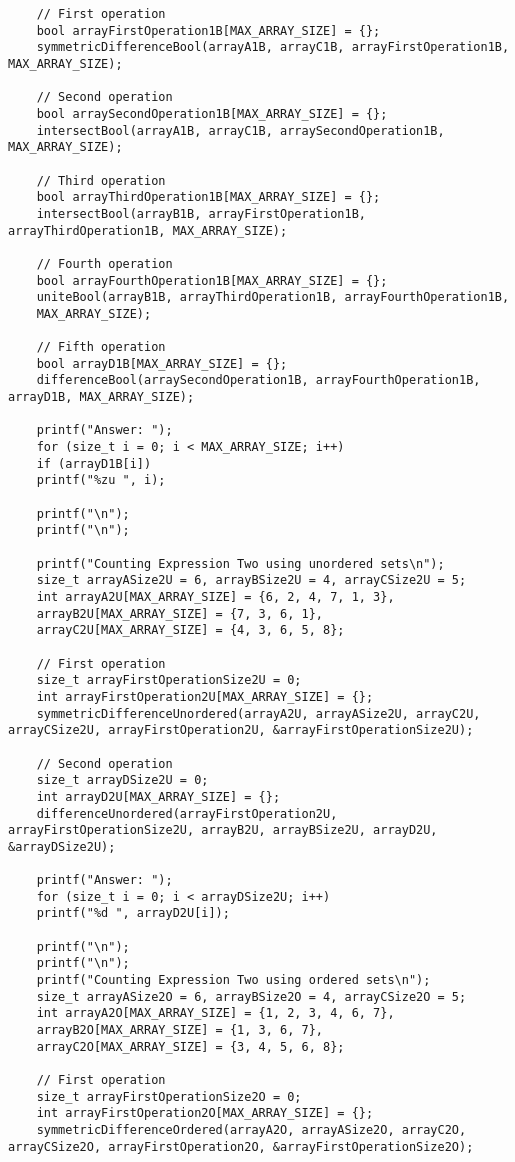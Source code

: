\documentclass[a4paper,14pt]{extarticle}
\begin{document}
\begin{enumerate}[№1. ]
\begin{verbatim}
	// First operation
	bool arrayFirstOperation1B[MAX_ARRAY_SIZE] = {};
	symmetricDifferenceBool(arrayA1B, arrayC1B, arrayFirstOperation1B, MAX_ARRAY_SIZE);
	
	// Second operation
	bool arraySecondOperation1B[MAX_ARRAY_SIZE] = {};
	intersectBool(arrayA1B, arrayC1B, arraySecondOperation1B, MAX_ARRAY_SIZE);
	
	// Third operation
	bool arrayThirdOperation1B[MAX_ARRAY_SIZE] = {};
	intersectBool(arrayB1B, arrayFirstOperation1B, arrayThirdOperation1B, MAX_ARRAY_SIZE);
	
	// Fourth operation
	bool arrayFourthOperation1B[MAX_ARRAY_SIZE] = {};
	uniteBool(arrayB1B, arrayThirdOperation1B, arrayFourthOperation1B,
	MAX_ARRAY_SIZE);
	
	// Fifth operation
	bool arrayD1B[MAX_ARRAY_SIZE] = {};
	differenceBool(arraySecondOperation1B, arrayFourthOperation1B, arrayD1B, MAX_ARRAY_SIZE);
	
	printf("Answer: ");
	for (size_t i = 0; i < MAX_ARRAY_SIZE; i++)
	if (arrayD1B[i])
	printf("%zu ", i);
	
	printf("\n");
	printf("\n");
	
	printf("Counting Expression Two using unordered sets\n");
	size_t arrayASize2U = 6, arrayBSize2U = 4, arrayCSize2U = 5;
	int arrayA2U[MAX_ARRAY_SIZE] = {6, 2, 4, 7, 1, 3},
	arrayB2U[MAX_ARRAY_SIZE] = {7, 3, 6, 1},
	arrayC2U[MAX_ARRAY_SIZE] = {4, 3, 6, 5, 8};
	
	// First operation
	size_t arrayFirstOperationSize2U = 0;
	int arrayFirstOperation2U[MAX_ARRAY_SIZE] = {};
	symmetricDifferenceUnordered(arrayA2U, arrayASize2U, arrayC2U, arrayCSize2U, arrayFirstOperation2U, &arrayFirstOperationSize2U);
	
	// Second operation
	size_t arrayDSize2U = 0;
	int arrayD2U[MAX_ARRAY_SIZE] = {};
	differenceUnordered(arrayFirstOperation2U, arrayFirstOperationSize2U, arrayB2U, arrayBSize2U, arrayD2U, &arrayDSize2U);
	
	printf("Answer: ");
	for (size_t i = 0; i < arrayDSize2U; i++)
	printf("%d ", arrayD2U[i]);
	
	printf("\n");
	printf("\n");
	printf("Counting Expression Two using ordered sets\n");
	size_t arrayASize2O = 6, arrayBSize2O = 4, arrayCSize2O = 5;
	int arrayA2O[MAX_ARRAY_SIZE] = {1, 2, 3, 4, 6, 7},
	arrayB2O[MAX_ARRAY_SIZE] = {1, 3, 6, 7},
	arrayC2O[MAX_ARRAY_SIZE] = {3, 4, 5, 6, 8};
	
	// First operation
	size_t arrayFirstOperationSize2O = 0;
	int arrayFirstOperation2O[MAX_ARRAY_SIZE] = {};
	symmetricDifferenceOrdered(arrayA2O, arrayASize2O, arrayC2O, arrayCSize2O, arrayFirstOperation2O, &arrayFirstOperationSize2O);
	

\end{verbatim}
\end{enumerate}
\end{document}
